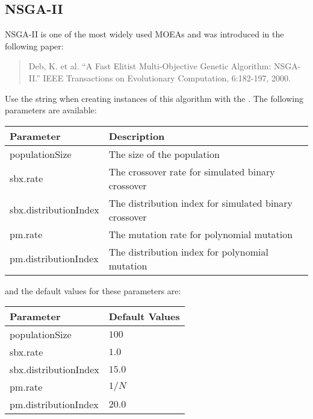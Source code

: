 \subsection{NSGA-II}
NSGA-II is one of the most widely used MOEAs and was introduced in the following paper:
\begin{quote}
Deb, K. et al.  ``A Fast Elitist Multi-Objective Genetic Algorithm: NSGA-II.''  IEEE Transactions on Evolutionary Computation, 6:182-197, 2000.
\end{quote}
Use the string  when creating instances of this algorithm with the .  The following parameters are available:
\newline
\newline
\begin{tabularx}{\linewidth}{lX}
  \hline
  Parameter & Description \\
  \hline
  populationSize & The size of the population \\
  sbx.rate & The crossover rate for simulated binary crossover \\
  sbx.distributionIndex & The distribution index for simulated binary crossover \\
  pm.rate & The mutation rate for polynomial mutation \\
  pm.distributionIndex & The distribution index for polynomial mutation \\
  \hline
\end{tabularx}
\newline
\newline
and the default values for these parameters are:
\newline
\newline
\begin{tabularx}{\linewidth}{lX}
  \hline
  Parameter & Default Values \\
  \hline
  populationSize & $100$ \\
  sbx.rate & $1.0$ \\
  sbx.distributionIndex & $15.0$ \\
  pm.rate & $1/N$ \\
  pm.distributionIndex & $20.0$ \\
  \hline
\end{tabularx}

